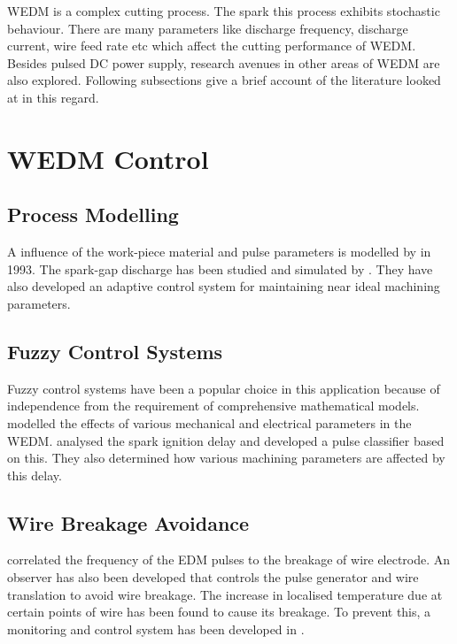 \label{chap:litreview}
	WEDM is a complex cutting process. The spark this process exhibits stochastic behaviour. There are many parameters like discharge frequency, discharge current, wire feed rate etc which affect the cutting performance of WEDM. Besides pulsed DC power supply, research avenues in other areas of WEDM are also explored. Following subsections give a brief account of the literature looked at in this regard.


\section{WEDM Control}
\subsection{Process Modelling}
	A influence of the work-piece material and pulse parameters is modelled by \citet{spur1993anode} in 1993. The spark-gap discharge has been studied and simulated by \citet{han2002high}. They have also developed an adaptive control system for maintaining near ideal machining parameters.

\subsection{Fuzzy Control Systems}
	Fuzzy control systems have been a popular choice in this application because of independence from the requirement of comprehensive mathematical models. \citet{kinoshita1976study} modelled the effects of various mechanical and electrical parameters in the WEDM. \cite{de1982has} analysed the spark ignition delay and developed a pulse classifier based on this. They also determined how various machining parameters are affected by this delay.

\subsection{Wire Breakage Avoidance}
	\citet{kinoshita1982control} correlated the frequency of the EDM pulses to the breakage of wire electrode. An observer has also been developed that controls the pulse generator and wire translation to avoid wire breakage. The increase in localised temperature due at certain points of wire has been found to cause its breakage. To prevent this, a monitoring and control system has been developed in \cite{kunieda1990line}.

